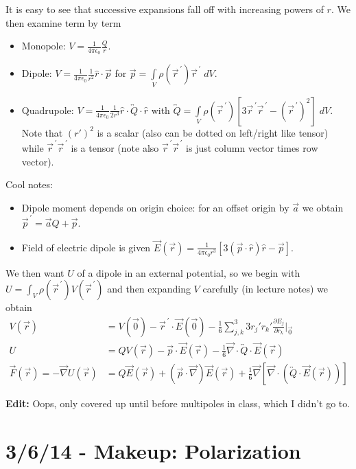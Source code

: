 \documentclass[10pt]{report}
\newcommand{\pd}[2]{\frac{\partial #1}{\partial#2}}
\newcommand{\tensor}[1]{\overleftrightarrow{#1}}
\newcommand{\pvec}[1]{\vec{#1}^{\,\prime}}
\newcommand{\grad}[0]{\vec{\nabla}}
\renewcommand{\div}[0]{\vec{\nabla}\cdot}
\begin{document}
It is easy to see that successive expansions fall off with increasing powers of $r$. We then examine term by term
\begin{itemize}
    \item Monopole: $V = \frac{1}{4\pi\epsilon_0}\frac{Q}{r}$.
    \item Dipole: $V = \frac{1}{4\pi\epsilon_0}\frac{1}{r^2}\hat{r}\cdot \vec{p}$ for $\vec{p} = \displaystyle\int\limits_{V}^{}\rho(\pvec{r})\pvec{r}\;dV$.
    \item Quadrupole: $V = \frac{1}{4\pi\epsilon_0}\frac{1}{2r^3} \hat{r}\cdot \tensor{Q} \cdot \hat{r}$ with $\tensor{Q} = \displaystyle\int\limits_{V}^{}\rho(\pvec{r})\left[ 3\pvec{r}\pvec{r} - \left( \pvec{r} \right)^2 \right]\;dV$. Note that $(r')^2$ is a scalar (also can be dotted on left/right like tensor) while $\pvec{r}\pvec{r}$ is a tensor (note also $\pvec{r}\pvec{r}$ is just column vector times row vector).
\end{itemize}

Cool notes:
\begin{itemize}
    \item Dipole moment depends on origin choice: for an offset origin by $\vec{a}$ we obtain $\pvec{p} = \vec{a}Q + \vec{p}$.
    \item Field of electric dipole is given $\vec{E}(\vec{r}) = \frac{1}{4\pi\epsilon_0 r^3}\left[ 3(\vec{p}\cdot \hat{r})\hat{r} - \vec{p} \right]$. 
\end{itemize}

We then want $U$ of a dipole in an external potential, so we begin with $U = \int_V \rho(\pvec{r}) V(\pvec{r})$ and then expanding $V$ carefully (in lecture notes) we obtain
\begin{align}
    V(\vec{r}) &= V(\vec{0}) - \pvec{r}\cdot \vec{E}(\vec{0}) - \frac{1}{6}\sum_{j,k}^{3} 3r_j'r_k'\pd{E_j}{r_k}\Big|_{\vec{0}}\\
    U &= QV(\vec{r}) - \vec{p}\cdot \vec{E}(\vec{r}) - \frac{1}{6}\div \tensor{Q}\cdot \vec{E}(\vec{r})\\
    \vec{F}(\vec{r}) = -\grad U(\vec{r}) &= Q\vec{E}(\vec{r}) + \left( \vec{p}\cdot \grad  \right)\vec{E}(\vec{r}) + \frac{1}{6}\grad \left[ \div \left( \tensor{Q}\cdot \vec{E}(\vec{r}) \right) \right]
\end{align}

\textbf{Edit:} Oops, only covered up until before multipoles in class, which I didn't go to.

\chapter{3/6/14 - Makeup: Polarization}
\end{document}
